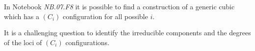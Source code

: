 \documentclass[a4paper, 11pt, reqno]{amsart}
\theoremstyle{plain}
\theoremstyle{definition}
\newcommand{\nb}[2]{\textsl{{NB}.{#1}.{#2}}}
\begin{document}
\medskip
In Notebook \nb{07}{F8} it is possible to find a construction of a 
generic cubic which has a $(C_i)$ configuration for all possible $i$.

It is a challenging question to identify the irreducible components and the degrees of the loci of $(C_i)$ configurations.




\end{document}
